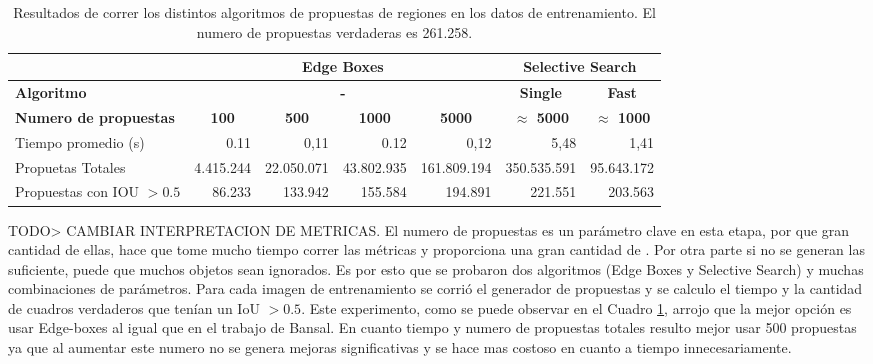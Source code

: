 \begin{table}[]
	\centering
	\resizebox{12.5cm}{!} {
	\begin{tabular}{|l|c|r|r|r|c|r|}
		\hline
		\textbf{}                     & \multicolumn{4}{c|}{\textbf{Edge Boxes}}                                                                                                   & \multicolumn{2}{c|}{\textbf{Selective Search}}               \\ \hline
		\textbf{Algoritmo}            & \multicolumn{4}{c|}{\textbf{-}}                                                                                                            & \textbf{Single}         & \multicolumn{1}{c|}{\textbf{Fast}} \\ \hline
		\textbf{Numero de propuestas} & \textbf{100}                 & \multicolumn{1}{c|}{\textbf{500}} & \multicolumn{1}{c|}{\textbf{1000}} & \multicolumn{1}{c|}{\textbf{5000}} & \textbf{$\approx$ 5000} & \multicolumn{1}{c|}{\textbf{$\approx$ 1000}}  \\ \hline
		Tiempo promedio (s)           & \multicolumn{1}{r|}{0.11}    & 0,11                              & 0.12                               & 0,12                               & \multicolumn{1}{r|}{5,48}   &         1,41                           \\ \hline
		Propuetas Totales             & \multicolumn{1}{r|}{4.415.244} & 22.050.071                          & 43.802.935                           & 161.809.194                          & \multicolumn{1}{r|}{350.535.591}   &   95.643.172                                 \\ \hline
		Propuestas con IOU $> 0.5$    & \multicolumn{1}{r|}{86.233}   & 133.942                            & 155.584                             & 194.891                             & \multicolumn{1}{r|}{221.551}   & 203.563                                   \\ \hline
	\end{tabular}
}
	\caption{Resultados de correr los distintos algoritmos de propuestas de regiones en los datos de entrenamiento. El numero de propuestas verdaderas es 261.258.}
	\label{tab:edgeVSselct}
\end{table}
TODO> CAMBIAR INTERPRETACION DE METRICAS.
El numero de propuestas es un parámetro clave en esta etapa, por que gran cantidad de ellas, hace que tome mucho tiempo correr las métricas y proporciona una gran cantidad de . Por otra parte si no se generan las suficiente, puede que muchos objetos sean ignorados. Es por esto que se probaron dos algoritmos (Edge Boxes y Selective Search) y muchas combinaciones de parámetros. Para cada imagen de entrenamiento se corrió el generador de propuestas y se calculo el tiempo y la cantidad de cuadros verdaderos que tenían un IoU $> 0.5$. Este experimento, como se puede observar en el Cuadro \ref{tab:edgeVSselct}, arrojo que la mejor opción es usar Edge-boxes al igual que en el trabajo de Bansal. En cuanto tiempo y numero de propuestas totales resulto mejor usar 500 propuestas ya que al aumentar este numero no se genera mejoras significativas y se hace mas costoso en cuanto a tiempo innecesariamente.\\

